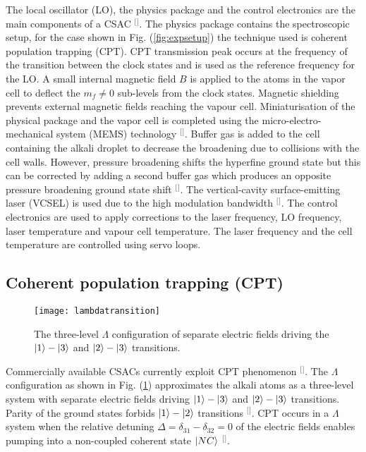 The local oscillator (LO), the physics package and the control electronics are the main components of a CSAC $^[$\citep{Knappe2007MEMSClocks}$^]$. The physics package contains the spectroscopic setup, for the case shown in Fig. (\ref{fig:expsetup}) the technique used is coherent population trapping (CPT). CPT transmission peak occurs at the frequency of the transition between the clock states and is used as the reference frequency for the LO. A small internal magnetic field $B$ is applied to the atoms in the vapor cell to deflect the $m_{f}\neq$0 sub-levels from the clock states. Magnetic shielding prevents external magnetic fields reaching the vapour cell. Miniaturisation of the physical package and the vapor cell is completed using the micro-electro-mechanical system (MEMS) technology $^[$\citep{Wang2014ReviewTrapping}$^]$. Buffer gas is added to the cell containing the alkali droplet to decrease the broadening due to collisions with the cell walls. However, pressure broadening shifts the hyperfine ground state but this can be corrected by adding a second buffer gas which produces an opposite pressure broadening ground state shift $^[$\citep{Lutwak2002TheInterrogation}$^]$. The vertical-cavity surface-emitting laser (VCSEL) is used due to the high modulation bandwidth $^[$\citep{Knappe2007MEMSClocks}$^]$. The control electronics are used to apply corrections to the laser frequency, LO frequency, laser temperature and vapour cell temperature. The laser frequency and the cell temperature are controlled using servo loops. 


\subsection{Coherent population trapping (CPT)}


\begin{figure}[t]
\centering
\texttt{[image: lambdatransition]}
\caption{\label{fig:lambdatransition}The three-level $\Lambda$ configuration of separate electric fields driving the $\lvert1\rangle-\lvert3\rangle$ and $\lvert2\rangle-\lvert3\rangle$ transitions.}
\end{figure}

Commercially available CSACs currently exploit CPT phenomenon $^[$\citep{articleb}$^]$. The $\Lambda$ configuration as shown in Fig. (\ref{fig:lambdatransition}) approximates the alkali atoms as a three-level system with separate electric fields driving $\lvert1\rangle-\lvert3\rangle$ and $\lvert2\rangle-\lvert3\rangle$ transitions. Parity of the ground states forbids $\lvert1\rangle-\lvert2\rangle$ transitions $^[$\citep{Khan2017CoherentEIT}$^]$. CPT occurs in a $\Lambda$ system when the relative detuning $\Delta=\delta_{31}-\delta_{32}=0$ of the electric fields enables pumping into a non-coupled coherent state $\lvert NC\rangle$ $^[$\citep{Phillips:05}$^]$. 

